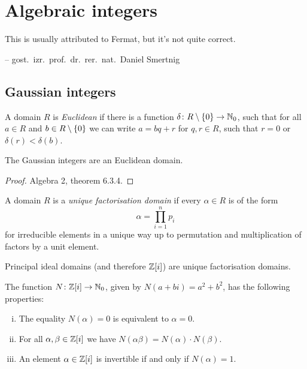 \section{Algebraic integers}

\epigraph{This is usually attributed to Fermat, but it's not quite
correct.}
{-- gost.~izr.~prof.~dr.~rer.~nat.~Daniel Smertnig}

\subsection{Gaussian integers}


\begin{definicija}
A domain $R$ is \emph{Euclidean} if there
is a function $\delta \colon R \setminus \left\{0\right\} \to \mathbb{N}_0$, such
that for all $a \in R$ and $b \in R \setminus \left\{0\right\}$ we can write
$a = bq + r$ for $q, r \in R$, such that $r = 0$ or
$\delta(r) < \delta(b)$.
\end{definicija}

\begin{trditev}
The Gaussian integers are an Euclidean domain.
\end{trditev}

\begin{proof}
Algebra 2, theorem 6.3.4.
\end{proof}

\begin{definicija}
A domain $R$ is a
\emph{unique factorisation domain}
if every $\alpha \in R$ is of the form
\[
\alpha = \prod_{i=1}^n p_i
\]
for irreducible elements in a unique way up to permutation and
multiplication of factors by a unit element.
\end{definicija}

\begin{opomba}
Principal ideal domains (and therefore $\mathbb{Z}[i]$) are unique
factorisation domains.
\end{opomba}

\begin{lema}
The function $N \colon \mathbb{Z}[i] \to \mathbb{N}_0$, given by
$N(a + bi) = a^2 + b^2$, has the following properties:

\begin{enumerate}[i)]
\item The equality $N(\alpha) = 0$ is equivalent to $\alpha = 0$.
\item For all $\alpha, \beta \in \mathbb{Z}[i]$ we have
$N(\alpha \beta) = N(\alpha) \cdot N(\beta)$.
\item An element $\alpha \in \mathbb{Z}[i]$ is invertible if and only if
$N(\alpha) = 1$.
\end{enumerate}
\end{lema}

